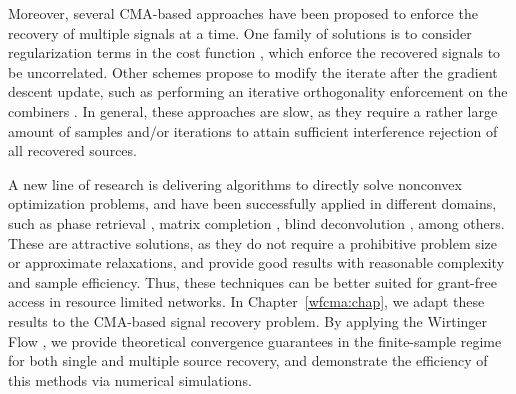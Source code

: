 Moreover, several CMA-based approaches have been proposed to enforce the recovery of multiple signals at a time. 
One family of solutions is to consider regularization terms in the cost function \cite{Bessios1992mimocrimno,Li1998adaptivemimocma,Ikhlef2007simplifiedmimocma}, which enforce the recovered signals to be uncorrelated. 
Other schemes propose to modify the iterate after the gradient descent update, such as performing an iterative orthogonality enforcement on the combiners \cite{Nguyen1997}. 
In general, these approaches are slow, as they require a rather large amount of samples and/or iterations to attain sufficient interference rejection of all recovered sources.


A new line of research is delivering algorithms to directly solve nonconvex optimization problems, and have been successfully applied in different domains, such as phase retrieval \cite{Candes2015a_phaseretrievalWF,Candes2013}, matrix completion \cite{Keshavan2010matrixcompletion,Yang2016lowrankfogran}, blind deconvolution \cite{Dong2018blinddemixingwf}, among others.
These are attractive solutions, as they do not require a prohibitive problem size or approximate relaxations, and provide good results with reasonable complexity and sample efficiency.
Thus, these techniques can be better suited for grant-free access in resource limited networks.
In Chapter~\ref{wfcma:chap}, we adapt these results to the CMA-based signal recovery problem. By applying the Wirtinger Flow \cite{Candes2015a_phaseretrievalWF}, we provide theoretical convergence guarantees in the finite-sample regime for both single and multiple source recovery, and demonstrate the efficiency of this methods via numerical simulations. 


